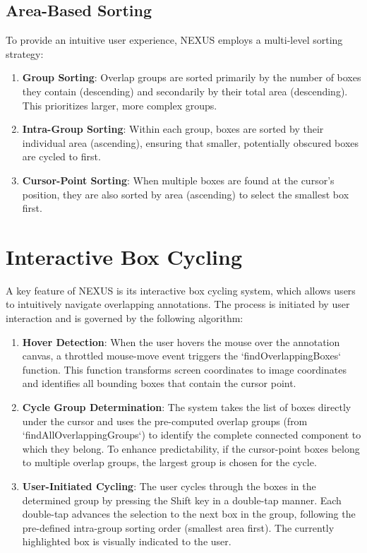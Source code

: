 \documentclass[10pt]{article}
\begin{document}
\subsection{Area-Based Sorting}
To provide an intuitive user experience, NEXUS employs a multi-level sorting strategy:
\begin{enumerate}
    \item \textbf{Group Sorting}: Overlap groups are sorted primarily by the number of boxes they contain (descending) and secondarily by their total area (descending). This prioritizes larger, more complex groups.
    \item \textbf{Intra-Group Sorting}: Within each group, boxes are sorted by their individual area (ascending), ensuring that smaller, potentially obscured boxes are cycled to first.
    \item \textbf{Cursor-Point Sorting}: When multiple boxes are found at the cursor's position, they are also sorted by area (ascending) to select the smallest box first.
\end{enumerate}

\section{Interactive Box Cycling}
A key feature of NEXUS is its interactive box cycling system, which allows users to intuitively navigate overlapping annotations. The process is initiated by user interaction and is governed by the following algorithm:

\begin{enumerate}
    \item \textbf{Hover Detection}: When the user hovers the mouse over the annotation canvas, a throttled mouse-move event triggers the `findOverlappingBoxes` function. This function transforms screen coordinates to image coordinates and identifies all bounding boxes that contain the cursor point.

    \item \textbf{Cycle Group Determination}: The system takes the list of boxes directly under the cursor and uses the pre-computed overlap groups (from `findAllOverlappingGroups`) to identify the complete connected component to which they belong. To enhance predictability, if the cursor-point boxes belong to multiple overlap groups, the largest group is chosen for the cycle.

    \item \textbf{User-Initiated Cycling}: The user cycles through the boxes in the determined group by pressing the Shift key in a double-tap manner. Each double-tap advances the selection to the next box in the group, following the pre-defined intra-group sorting order (smallest area first). The currently highlighted box is visually indicated to the user.
\end{enumerate}
\end{document}
